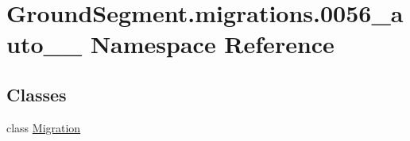 \hypertarget{namespace_ground_segment_1_1migrations_1_10056__auto__20170327__1906}{}\section{Ground\+Segment.\+migrations.0056\+\_\+auto\+\_\+\_ Namespace Reference}
\label{namespace_ground_segment_1_1migrations_1_10056__auto__20170327__1906}
\subsection*{Classes}
\begin{DoxyCompactItemize}
\item 
class \hyperlink{class_ground_segment_1_1migrations_1_10056__auto__20170327__1906_1_1_migration}{Migration}
\end{DoxyCompactItemize}
